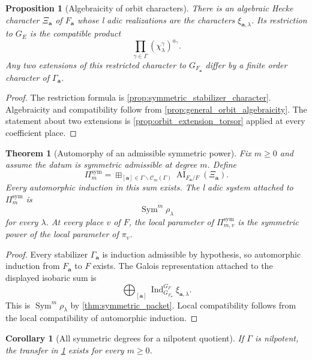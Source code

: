 \documentclass{aomart}
\newtheorem{theorem}{Theorem}[section]
\newtheorem{proposition}[proposition]{Proposition}
\newtheorem{corollary}[corollary]{Corollary}
\theoremstyle{definition}
\theoremstyle{remark}
\newcommand{\Ind}{\operatorname{Ind}}
\newcommand{\AI}{\operatorname{AI}}
\newcommand{\Sym}{\operatorname{Sym}}
\newcommand{\calC}{\mathcal C}
\newcommand{\boxplusop}{\mathbin{\boxplus}}
\begin{document}
\begin{proposition}[Algebraicity of orbit characters]\label{prop:orbit_character_algebraic}
There is an algebraic Hecke character \(\Xi_{\bm a}\) of \(F_{\bm a}\) whose l adic realizations are the characters \(\xi_{\bm a,\lambda}\). Its restriction to \(G_E\) is the compatible product
\[
\boxed{
\prod_{\gamma\in\Gamma}
(\chi_\lambda^\gamma)^{a_\gamma}.
}
\]
Any two extensions of this restricted character to \(G_{F_{\bm a}}\) differ by a finite order character of \(\Gamma_{\bm a}\).
\end{proposition}

\begin{proof}
The restriction formula is \cref{prop:symmetric_stabilizer_character}. Algebraicity and compatibility follow from \cref{prop:general_orbit_algebraicity}. The statement about two extensions is \cref{prop:orbit_extension_torsor} applied at every coefficient place.
\end{proof}

\begin{theorem}[Automorphy of an admissible symmetric power]\label{thm:global_symmetric_automorphy}
Fix \(m\geq0\) and assume the datum is symmetric admissible at degree \(m\). Define
\[
\boxed{
\Pi_m^{\mathrm{sym}}
=
\boxplusop_{[\bm a]\in\Gamma\backslash\calC_m(\Gamma)}
\AI_{F_{\bm a}/F}(\Xi_{\bm a}).
}
\]
Every automorphic induction in this sum exists. The l adic system attached to \(\Pi_m^{\mathrm{sym}}\) is
\[
\boxed{
\Sym^m\rho_\lambda
}
\]
for every \(\lambda\). At every place \(v\) of \(F\), the local parameter of \(\Pi_{m,v}^{\mathrm{sym}}\) is the symmetric power of the local parameter of \(\pi_v\).
\end{theorem}

\begin{proof}
Every stabilizer \(\Gamma_{\bm a}\) is induction admissible by hypothesis, so automorphic induction from \(F_{\bm a}\) to \(F\) exists. The Galois representation attached to the displayed isobaric sum is
\[
\bigoplus_{[\bm a]}
\Ind_{G_{F_{\bm a}}}^{G_F}\xi_{\bm a,\lambda}.
\]
This is \(\Sym^m\rho_\lambda\) by \cref{thm:symmetric_packet}. Local compatibility follows from the local compatibility of automorphic induction.
\end{proof}

\begin{corollary}[All symmetric degrees for a nilpotent quotient]\label{cor:nilpotent_all_symmetric}
If \(\Gamma\) is nilpotent, the transfer in \cref{thm:global_symmetric_automorphy} exists for every \(m\geq0\).
\end{corollary}
\end{document}
